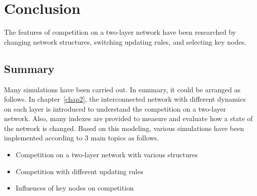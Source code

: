 
\chapter{Conclusion}
\label{chap6}
The features of competition on a two-layer network have been researched by changing network structures, switching updating rules, and selecting key nodes.\\
 
\section{Summary}
Many simulations have been carried out. In summary, it could be arranged as follows. 
In chapter~\ref{chap2}, the interconnected network with different dynamics on each layer is introduced to understand the competition on a two-layer network.  Also, many indexes are provided to measure and evaluate how a state of the network is changed. Based on this modeling, various simulations have been implemented according to 3 main topics as follows.

\begin{itemize}
\item Competition on a two-layer network with various structures
\item Competition with different updating rules
\item Influences of key nodes on competition
\end{itemize}

